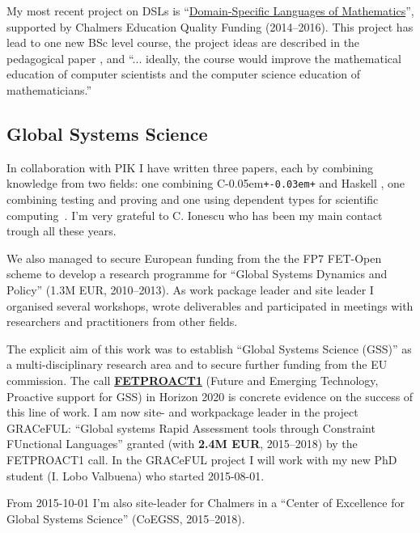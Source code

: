 \documentclass[11pt,twoside,twocolumn]{article}
\providecommand{\cpp}{C\kern-0.05em\texttt{+\kern-0.03em+}}
\providecommand{\Cpp}{\cpp}
\begin{document}
My most recent project on DSLs is
``\href{http://wiki.portal.chalmers.se/cse/pmwiki.php/FP/DSLsofMath}{Domain-Specific
  Languages of Mathematics}'', supported by Chalmers Education Quality
Funding (2014--2016).
%
This project has lead to one new BSc level course, the project ideas
are described in the pedagogical paper
\citep{TFPIE15_DSLsofMath_IonescuJansson},
%
and ``... ideally, the course would improve the mathematical education
of computer scientists and the computer science education of
mathematicians.''


\subsection{Global Systems Science}\label{sec:GSS}

In collaboration with PIK I have written three papers, each by
combining knowledge from two fields: one combining \Cpp{} and Haskell
\citep{LinckeJanssonetalDSLWC2009}, one combining testing and proving
\citep{ionescujansson:LIPIcs:2013:3899} and one using dependent types
for scientific computing~\citep{ionescujansson2013DTPinSciComp}.
%
I'm very grateful to C. Ionescu who has been my main contact trough
all these years.

We also managed to secure European funding from the the FP7 FET-Open
scheme to develop a research programme for ``Global Systems Dynamics
and Policy'' (1.3M EUR, 2010--2013).
%
As work package leader and site leader I organised several workshops,
wrote deliverables and participated in meetings with researchers and
practitioners from other fields.

The explicit aim of this work was to establish ``Global Systems
Science (GSS)'' as a multi-disciplinary research area and to secure further
funding from the EU commission.
%
The call
\textbf{\href{http://ec.europa.eu/research/participants/portal/desktop/en/opportunities/h2020/topics/2074-fetproact-1-2014.html}{FETPROACT1}}
(Future and Emerging Technology, Proactive support for GSS) in Horizon
2020 is concrete evidence on the success of this line of work.
%
I am now site- and workpackage leader in the project GRACeFUL:
``Global systems Rapid Assessment tools through Constraint FUnctional
Languages'' granted (with \textbf{2.4M EUR}, 2015--2018) by the
FETPROACT1 call.
%
In the GRACeFUL project I will work with my new PhD student (I. Lobo
Valbuena) who started 2015-08-01.

From 2015-10-01 I'm also site-leader for Chalmers in a ``Center of
Excellence for Global Systems Science'' (CoEGSS, 2015--2018).
%
\end{document}
